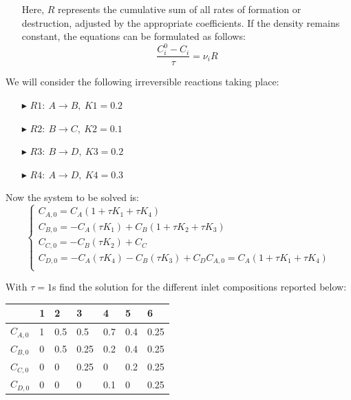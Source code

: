 \documentclass[xcolor={dvipsnames,rgb}, aspectratio=169]{beamer}
\begin{document}
\begin{frame}{}
   \begin{itemize}
      \item[ ] Here, $R$ represents the cumulative sum of all rates of formation or
         destruction, adjusted by the appropriate coefficients. If the density remains
         constant, the equations can be formulated as follows:
         \begin{equation*}
            \frac{C_{i}^{0}-C_{i}}{\tau} = \nu_{i}R
         \end{equation*}
   \end{itemize}
   We will consider the following irreversible reactions taking place:
   \begin{itemize}
      \item[$\blacktriangleright$] $R1:\: A\longrightarrow B,\: K1=0.2$
      \item[$\blacktriangleright$] $R2:\: B\longrightarrow C,\: K2=0.1$
      \item[$\blacktriangleright$] $R3:\: B\longrightarrow D,\: K3=0.2$
      \item[$\blacktriangleright$] $R4:\: A\longrightarrow D,\: K4=0.3$
   \end{itemize}
\end{frame}

\begin{frame}{}
   Now the system to be solved is:\\
   \begin{equation*}
   \begin{cases}
      C_{A,0} = C_{A}\left(1+\tau K_{1} + \tau K_{4}\right) \\
      C_{B,0} = -C_{A}\left(\tau K_{1}\right) + C_{B}\left(1+\tau K_{2} + \tau K_{3}\right) \\
      C_{C,0} = -C_{B}\left(\tau K_{2}\right) + C_{C} \\
      C_{D,0} = -C_{A}\left(\tau K_{4}\right)-C_{B}\left(\tau K_{3}\right) + C_{D}
      C_{A,0} = C_{A}\left(1+\tau K_{1} + \tau K_{4}\right) \\
   \end{cases}
   \end{equation*}

   With $\tau = 1$s find the solution for the different inlet compositions reported
   below:
   \begin{table}
   \centering
   \begin{tabular}{l|l|l|l|l|l|l}
      & 1 & 2   & 3    & 4   & 5   & 6     \\
      \hline
      $C_{A,0}$ & 1 & 0.5 & 0.5  & 0.7 & 0.4 & 0.25  \\
      $C_{B,0}$ & 0 & 0.5 & 0.25 & 0.2 & 0.4 & 0.25  \\
      $C_{C,0}$ & 0 & 0   & 0.25 & 0   & 0.2 & 0.25  \\
      $C_{D,0}$ & 0 & 0   & 0    & 0.1 & 0   & 0.25
   \end{tabular}
   \end{table}
\end{frame}
\end{document}
